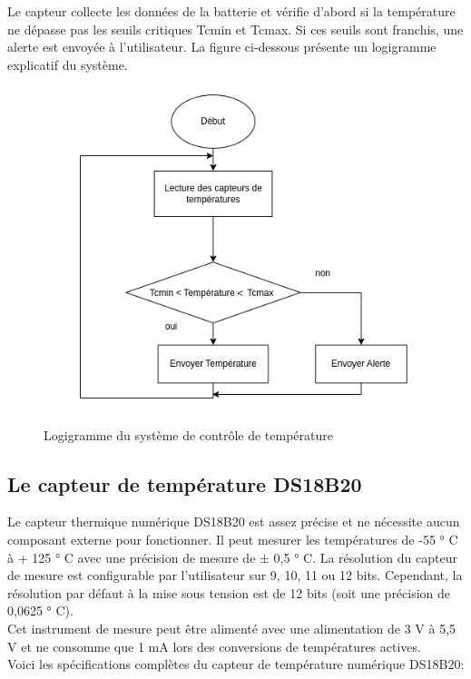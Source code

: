Le capteur collecte les données de la batterie et vérifie d'abord si la température ne dépasse pas les seuils critiques Tcmin et Tcmax. Si ces seuils sont franchis, une alerte est envoyée à l'utilisateur.
La figure ci-dessous présente un logigramme explicatif du système.

\begin{figure}[H]
	\centering
	\includegraphics[width=12cm]{./img/LogigrammeDuSystemeTemperature.png}
	\caption{Logigramme du système de contrôle de température }
	\label{i1}
\end{figure}

\subsection*{Le capteur de température DS18B20} 
Le capteur thermique numérique DS18B20 est assez précise et ne nécessite aucun composant externe pour fonctionner. Il peut mesurer les températures de -55 ° C à + 125 ° C avec une précision de mesure de ± 0,5 ° C.
La résolution du capteur de mesure est configurable par l'utilisateur sur 9, 10, 11 ou 12 bits. Cependant, la résolution par défaut à la mise sous tension est de 12 bits (soit une précision de 0,0625 ° C).
\\

\noindent Cet instrument de mesure peut être alimenté avec une alimentation de 3 V à 5,5 V et ne consomme que 1 mA lors des conversions de températures actives.
\\

\noindent Voici les spécifications complètes du capteur de température numérique DS18B20: 

